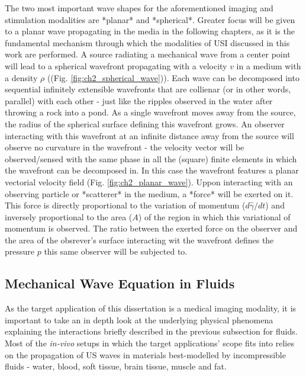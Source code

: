 The two most important wave shapes for the aforementioned imaging and stimulation modalities 
are *planar* and *spherical*. Greater focus will be given to a planar wave propagating 
in the media in the following chapters, as it is the fundamental mechanism through 
which the modalities of USI discussed in this work are performed.
A source radiating a mechanical wave from a center point will lead to a spherical wavefront 
propagating with a velocity $v$ in a medium with a density $\rho$ ((Fig. \ref{fig:ch2_spherical_wave})). 
Each wave can be decomposed into sequential infinitely extensible wavefronts that are collienar 
(or in other words, parallel) with each other - just like the ripples observed in the water 
after throwing a rock into a pond. As a single wavefront moves away from the source,
the radius of the spherical surface defining this wavefront grows. An observer interacting 
with this wavefront at an infinite distance away from the source will observe no curvature 
in the wavefront - the velocity vector will be observed/sensed with the same phase in 
all the (square) finite elements in which the wavefront can be decomposed in. In this case 
the wavefront features a planar vectorial velocity field (Fig. \ref{fig:ch2_planar_wave}).
Uppon interacting with an observing particle or *scatterer* in the medium, a *force* will be exerted on it. 
This force is directly proportional to the variation of momentum ($d\hat{\gamma} / dt$) and inversely 
proportional to the area ($A$) of the region in which this variational of momentum is observed. The 
ratio between the exerted force on the observer and the area of the obsrever's surface interacting wit 
the wavefront defines the pressure $p$ this same observer will be subjected to.


\subsection{Mechanical Wave Equation in Fluids}
\label{subsec:ch2_2_mechanical_wave_equation}

As the target application of this dissertation is a medical imaging modality, it is 
important to take an in depth look at the underlying physical phenomena explaining the 
interactions briefly described in the previous subsection for fluids. Most of the \textit{in-vivo} 
setups in which the target applications' scope fits into relies on the propagation of US waves 
in materials best-modelled by incompressible fluids - water, blood, soft tissue, brain 
tissue, muscle and fat. 

